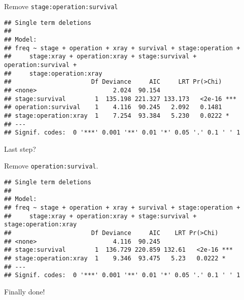 \begin{frame}[fragile]{Remove \texttt{stage:operation:survival}}
  
{\small  
\begin{knitrout}
\color{fgcolor}\begin{kframe}
\begin{alltt}
\hlkwb{=}\hlopt{~}\hlopt{-}\hlopt{:}\hlopt{:}
\hlstd{=}\hlstd{)}
\end{alltt}
\begin{verbatim}
## Single term deletions
## 
## Model:
## freq ~ stage + operation + xray + survival + stage:operation + 
##     stage:xray + operation:xray + stage:survival + operation:survival + 
##     stage:operation:xray
##                      Df Deviance     AIC     LRT Pr(>Chi)    
## <none>                     2.024  90.154                     
## stage:survival        1  135.198 221.327 133.173   <2e-16 ***
## operation:survival    1    4.116  90.245   2.092   0.1481    
## stage:operation:xray  1    7.254  93.384   5.230   0.0222 *  
## ---
## Signif. codes:  0 '***' 0.001 '**' 0.01 '*' 0.05 '.' 0.1 ' ' 1
\end{verbatim}
\end{kframe}
\end{knitrout}
}
  
  
\end{frame}

\begin{frame}[fragile]{Last step?}
  
Remove \texttt{operation:survival}.  
  
{\small  
\begin{knitrout}
\color{fgcolor}\begin{kframe}
\begin{alltt}
\hlkwb{=}\hlopt{~}\hlopt{-}\hlopt{:}
\hlstd{=}\hlstd{)}
\end{alltt}
\begin{verbatim}
## Single term deletions
## 
## Model:
## freq ~ stage + operation + xray + survival + stage:operation + 
##     stage:xray + operation:xray + stage:survival + stage:operation:xray
##                      Df Deviance     AIC    LRT Pr(>Chi)    
## <none>                     4.116  90.245                    
## stage:survival        1  136.729 220.859 132.61   <2e-16 ***
## stage:operation:xray  1    9.346  93.475   5.23   0.0222 *  
## ---
## Signif. codes:  0 '***' 0.001 '**' 0.01 '*' 0.05 '.' 0.1 ' ' 1
\end{verbatim}
\end{kframe}
\end{knitrout}
}
  
Finally done!
  
\end{frame}

